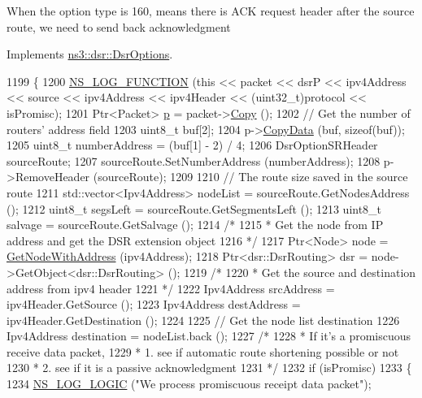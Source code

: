 When the option type is 160, means there is A\+CK request header after the source route, we need to send back acknowledgment 

Implements \hyperlink{classns3_1_1dsr_1_1DsrOptions_ac34fb87a95464f3ea9d82ad12253a5cc}{ns3\+::dsr\+::\+Dsr\+Options}.


\begin{DoxyCode}
1199 \{
1200   \hyperlink{log-macros-disabled_8h_a90b90d5bad1f39cb1b64923ea94c0761}{NS\_LOG\_FUNCTION} (\textcolor{keyword}{this} << packet << dsrP << ipv4Address << source << ipv4Address << 
      ipv4Header << (uint32\_t)protocol << isPromisc);
1201   Ptr<Packet> \hyperlink{lte__link__budget_8m_ac9de518908a968428863f829398a4e62}{p} = packet->\hyperlink{classns3_1_1Packet_a5d5c70802a5f77fc5f0001e0cfc1898b}{Copy} ();
1202   \textcolor{comment}{// Get the number of routers' address field}
1203   uint8\_t buf[2];
1204   p->\hyperlink{classns3_1_1Packet_a5a6d304b9e0d90733919ffe224b98f0d}{CopyData} (buf, \textcolor{keyword}{sizeof}(buf));
1205   uint8\_t numberAddress = (buf[1] - 2) / 4;
1206   DsrOptionSRHeader sourceRoute;
1207   sourceRoute.SetNumberAddress (numberAddress);
1208   p->RemoveHeader (sourceRoute);
1209 
1210   \textcolor{comment}{// The route size saved in the source route}
1211   std::vector<Ipv4Address> nodeList = sourceRoute.GetNodesAddress ();
1212   uint8\_t segsLeft = sourceRoute.GetSegmentsLeft ();
1213   uint8\_t salvage = sourceRoute.GetSalvage ();
1214   \textcolor{comment}{/*}
1215 \textcolor{comment}{   * Get the node from IP address and get the DSR extension object}
1216 \textcolor{comment}{   */}
1217   Ptr<Node> node = \hyperlink{classns3_1_1dsr_1_1DsrOptions_a1a91f820f3d754a477a54bad547ca659}{GetNodeWithAddress} (ipv4Address);
1218   Ptr<dsr::DsrRouting> dsr = node->GetObject<dsr::DsrRouting> ();
1219   \textcolor{comment}{/*}
1220 \textcolor{comment}{   * Get the source and destination address from ipv4 header}
1221 \textcolor{comment}{   */}
1222   Ipv4Address srcAddress = ipv4Header.GetSource ();
1223   Ipv4Address destAddress = ipv4Header.GetDestination ();
1224 
1225   \textcolor{comment}{// Get the node list destination}
1226   Ipv4Address destination = nodeList.back ();
1227   \textcolor{comment}{/*}
1228 \textcolor{comment}{   * If it's a promiscuous receive data packet,}
1229 \textcolor{comment}{   * 1. see if automatic route shortening possible or not}
1230 \textcolor{comment}{   * 2. see if it is a passive acknowledgment}
1231 \textcolor{comment}{   */}
1232   \textcolor{keywordflow}{if} (isPromisc)
1233     \{
1234       \hyperlink{group__logging_ga88acd260151caf2db9c0fc84997f45ce}{NS\_LOG\_LOGIC} (\textcolor{stringliteral}{"We process promiscuous receipt data packet"});

\end{DoxyCode}
